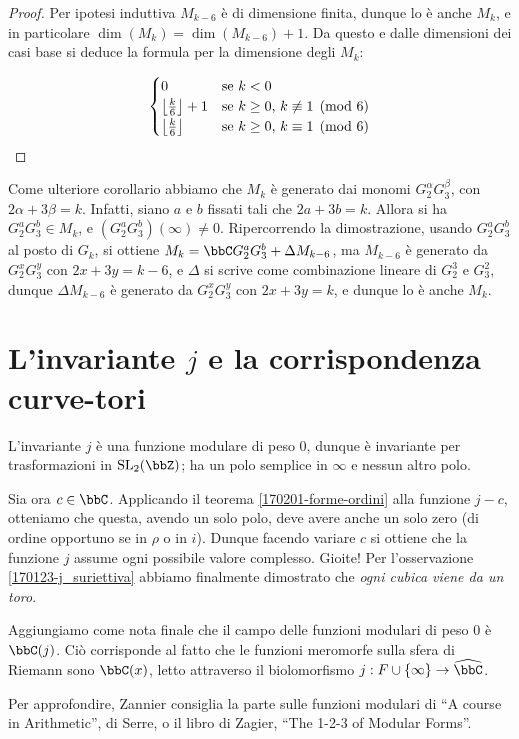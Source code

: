 \begin{proof}
	Per ipotesi induttiva $M_{k-6}$ è di dimensione finita, dunque lo è anche $M_k$, e in particolare $\dim(M_k)=\dim(M_{k-6})+1$.
	Da questo e dalle dimensioni dei casi base si deduce la formula per la dimensione degli $M_k$:
	
	\begin{equation*}
		\begin{cases}
			0 						&	\text{se $k<0$}\\
			\left\lfloor \frac{k}{6} \right\rfloor +1	&	\text{se $k\geq0$, $k\not\equiv1\pmod{6}$}\\
			\left\lfloor \frac{k}{6} \right\rfloor		&	\text{se $k\geq0$, $k\equiv1\pmod{6}$}
		\end{cases}
	\end{equation*}

\end{proof}

Come ulteriore corollario abbiamo che $M_k$ è generato dai monomi $G_2^\alpha G_3^\beta$, con $2\alpha+3\beta=k$.
Infatti, siano $a$ e $b$ fissati tali che $2a+3b=k$.
Allora si ha $G_2^a G_3^b\in M_k$, e $(G_2^a G_3^b)(\infty)\neq0$.
Ripercorrendo la dimostrazione, usando $G_2^a G_3^b$ al posto di $G_k$, si ottiene $M_k=\bbC G_2^a G_3^b + \Delta M_{k-6}$, ma $M_{k-6}$ è generato da $G_2^x G_3^y$ con $2x+3y=k-6$, e $\Delta$ si scrive come combinazione lineare di $G_2^3$ e $G_3^2$, dunque $\Delta M_{k-6}$ è generato da $G_2^x G_3^y$ con $2x+3y=k$, e dunque lo è anche $M_k$.


\section{L'invariante $j$ e la corrispondenza curve-tori}

L'invariante $j$ è una funzione modulare di peso $0$, dunque è invariante per trasformazioni in $\SL_2(\bbZ)$; ha un polo semplice in $\infty$ e nessun altro polo.

Sia ora $c \in \bbC$. Applicando il teorema \ref{170201-forme-ordini} alla funzione $j-c$, otteniamo che questa, avendo un solo polo, deve avere anche un solo zero (di ordine opportuno se in $\rho$ o in $i$). Dunque facendo variare $c$ si ottiene che la funzione $j$ assume ogni possibile valore complesso. Gioite! Per l'osservazione \ref{170123-j_suriettiva} abbiamo finalmente dimostrato che \emph{ogni cubica viene da un toro}.

Aggiungiamo come nota finale che il campo delle funzioni modulari di peso $0$ è $\bbC(j)$. Ciò corrisponde al fatto che le funzioni meromorfe sulla sfera di Riemann sono $\bbC(x)$, letto attraverso il biolomorfismo $j : F \cup \{ \infty \} \rightarrow \hat \bbC$.

Per approfondire, Zannier consiglia la parte sulle funzioni modulari di ``A course in Arithmetic'', di Serre, o il libro di Zagier, ``The 1-2-3 of Modular Forms''.

